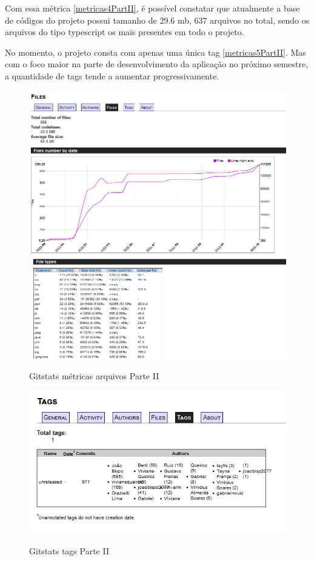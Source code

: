 Com essa métrica  \autoref{metricas4PartII}, é possível constatar que atualmente a base de códigos do projeto possui tamanho de 29.6 \ac{mb}, 637 arquivos no total, sendo os arquivos do tipo typescript os mais presentes em todo o projeto. 

\pagebreak



No momento, o projeto consta com apenas uma única tag \autoref{metricas5PartII}. Mas com o foco maior na parte de desenvolvimento da aplicação no próximo semestre, a quantidade de tags tende a aumentar progressivamente.


\begin{figure}[htb]
	\centering
	\caption{\label{fig_arq_virado}Gitstats métricas arquivos Parte II}
	\includegraphics[width=1.00\textwidth]{anexos/metricas4PartII.png}
	\label{metricas4PartII}
\end{figure}

\begin{figure}[htb]
	\centering
	\caption{\label{fig_arq_virado}Gitstats tags Parte II }
	\includegraphics[width=1.00\textwidth]{anexos/metricas5PartII.png}
	\label{metricas5PartII}
 \end{figure}

